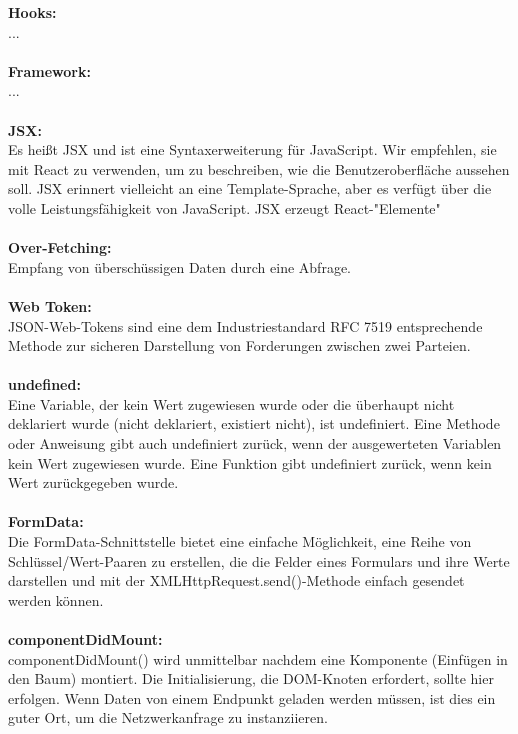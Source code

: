 

\textbf{Hooks:}\\
...
\\\\
\textbf{Framework:}\\
...
\\\\
\textbf{JSX:}\\
Es heißt JSX und ist eine Syntaxerweiterung für JavaScript. Wir empfehlen, sie mit React zu verwenden, um zu beschreiben, wie die Benutzeroberfläche aussehen soll. JSX erinnert vielleicht an eine Template-Sprache, aber es verfügt über die volle Leistungsfähigkeit von JavaScript. JSX erzeugt React-"Elemente"
\\\\
\textbf{Over-Fetching:}\\
Empfang von überschüssigen Daten durch eine Abfrage.
\\\\
\textbf{Web Token:}\\
JSON-Web-Tokens sind eine dem Industriestandard RFC 7519 entsprechende Methode zur sicheren Darstellung von Forderungen zwischen zwei Parteien.
\\\\
\textbf{undefined:}\\
Eine Variable, der kein Wert zugewiesen wurde oder die überhaupt nicht deklariert wurde (nicht deklariert, existiert nicht), ist undefiniert. Eine Methode oder Anweisung gibt auch undefiniert zurück, wenn der ausgewerteten Variablen kein Wert zugewiesen wurde. Eine Funktion gibt undefiniert zurück, wenn kein Wert zurückgegeben wurde.
\\\\
\textbf{FormData:}\\
Die FormData-Schnittstelle bietet eine einfache Möglichkeit, eine Reihe von Schlüssel/Wert-Paaren zu erstellen, die die Felder eines Formulars und ihre Werte darstellen und mit der XMLHttpRequest.send()-Methode einfach gesendet werden können.
\\\\
\textbf{componentDidMount:}\\
componentDidMount() wird unmittelbar nachdem eine Komponente (Einfügen in den Baum) montiert. Die Initialisierung, die DOM-Knoten erfordert, sollte hier erfolgen. Wenn Daten von einem Endpunkt geladen werden müssen, ist dies ein guter Ort, um die Netzwerkanfrage zu instanziieren.
